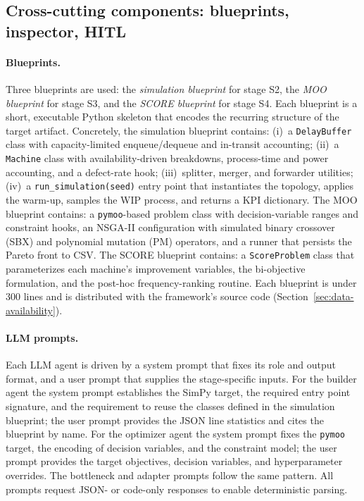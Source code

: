 \documentclass[a4paper,fleqn]{cas-sc}
\begin{document}

  \subsection{Cross-cutting components: blueprints, inspector, HITL}\label{sec:framework-crosscut}                      
   
  \paragraph{Blueprints.} Three blueprints are used: the \emph{simulation blueprint} for stage S2, the \emph{MOO        
  blueprint} for stage S3, and the \emph{SCORE blueprint} for stage S4. Each blueprint is a short, executable Python
  skeleton that encodes the recurring structure of the target artifact. Concretely, the simulation blueprint contains:  
  (i)~a \texttt{DelayBuffer} class with capacity-limited enqueue/dequeue and in-transit accounting; (ii)~a
  \texttt{Machine} class with availability-driven breakdowns, process-time and power accounting, and a defect-rate hook;
   (iii)~splitter, merger, and forwarder utilities; (iv)~a \texttt{run\_simulation(seed)} entry point that instantiates
  the topology, applies the warm-up, samples the WIP process, and returns a KPI dictionary. The MOO blueprint contains:
  a \texttt{pymoo}-based problem class with decision-variable ranges and constraint hooks, an NSGA-II configuration with
   simulated binary crossover (SBX) and polynomial mutation (PM) operators, and a runner that persists the Pareto front to CSV. The SCORE blueprint contains: a
  \texttt{ScoreProblem} class that parameterizes each machine's improvement variables, the bi-objective formulation, and
   the post-hoc frequency-ranking routine. Each blueprint is under 300 lines and is distributed with the framework's
  source code (Section~\ref{sec:data-availability}).

  \paragraph{LLM prompts.} Each LLM agent is driven by a system prompt that fixes its role and output format, and a user
   prompt that supplies the stage-specific inputs. For the builder agent the system prompt establishes the SimPy target,
   the required entry point signature, and the requirement to reuse the classes defined in the simulation blueprint; the
   user prompt provides the JSON line statistics and cites the blueprint by name. For the optimizer agent the system
  prompt fixes the \texttt{pymoo} target, the encoding of decision variables, and the constraint model; the user prompt
  provides the target objectives, decision variables, and hyperparameter overrides. The bottleneck and adapter prompts
  follow the same pattern. All prompts request JSON- or code-only responses to enable deterministic parsing.
\end{document}
